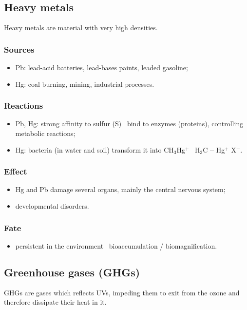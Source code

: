 \documentclass{article}
\begin{document}
\subsection{Heavy metals}
Heavy metals are material with very high densities.

\subsubsection{Sources}
\begin{itemize}
    \item Pb: lead-acid batteries, lead-bases paints, leaded gasoline;
    \item Hg: coal burning, mining, industrial processes.
\end{itemize}

\subsubsection{Reactions}
\begin{itemize}
    \item Pb, Hg: strong affinity to sulfur (S) \textrightarrow\ bind to enzymes (proteins),
        controlling metabolic reactions;
    \item Hg: bacteria (in water and soil) transform it into CH$_3$Hg$^+$ \textrightarrow\ H$_3$C \textbf{--} Hg$^+$ X$^-$.
\end{itemize}

\subsubsection{Effect}
\begin{itemize}
    \item Hg and Pb damage several organs, mainly the central nervous system;
    \item developmental disorders.
\end{itemize}

\subsubsection{Fate}
\begin{itemize}
    \item persistent in the environment \textrightarrow\ bioaccumulation / biomagnification.
\end{itemize}

\subsection{Greenhouse gases (GHGs)}
GHGs are gases which reflects UVs, impeding them to exit from the ozone
and therefore dissipate their heat in it.
\end{document}
